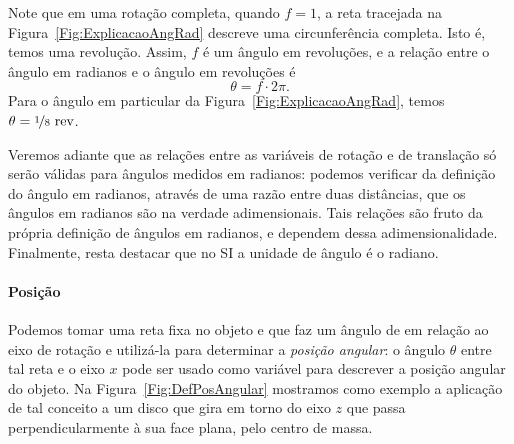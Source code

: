 Note que em uma rotação completa, quando $f = 1$, a reta tracejada na Figura~\ref{Fig:ExplicacaoAngRad} descreve uma circunferência completa. Isto é, temos uma revolução. Assim, $f$ é um ângulo em revoluções, e a relação entre o ângulo em radianos e o ângulo em revoluções é
\begin{equation}
    \theta = f \cdot 2 \pi.
\end{equation}
%
Para o ângulo em particular da Figura~\ref{Fig:ExplicacaoAngRad}, temos $\theta = \nicefrac{1}{8}~\rm{rev}$.

Veremos adiante que as relações entre as variáveis de rotação e de translação só serão válidas para ângulos medidos em radianos: podemos verificar da definição do ângulo em radianos, através de uma razão entre duas distâncias, que os ângulos em radianos são na verdade adimensionais. Tais relações são fruto da própria definição de ângulos em radianos, e dependem dessa adimensionalidade. Finalmente, resta destacar que no SI a unidade de ângulo é o radiano.


\paragraph{Posição}

Podemos tomar uma reta fixa no objeto e que faz um ângulo de  em relação ao eixo de rotação e utilizá-la para determinar a \emph{posição angular}: o ângulo $\theta$ entre tal reta e o eixo $x$ pode ser usado como variável para descrever a posição angular do objeto. Na Figura~\ref{Fig:DefPosAngular} mostramos como exemplo a aplicação de tal conceito a um disco que gira em torno do eixo $z$ que passa perpendicularmente à sua face plana, pelo centro de massa.


